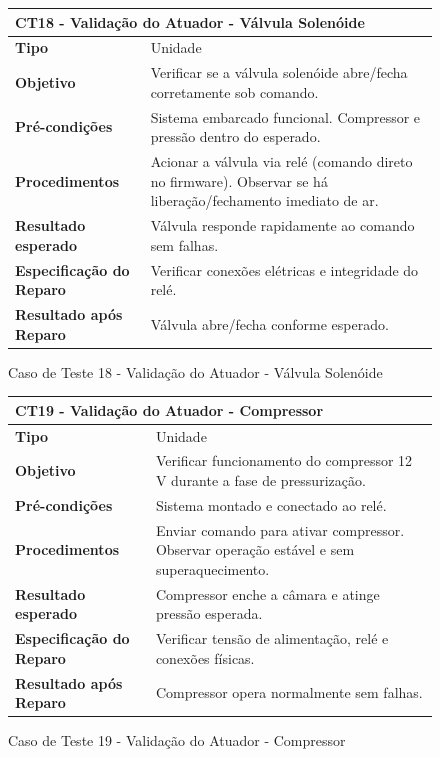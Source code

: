 \begin{figure}[H]
    \centering
\begin{longtable}{|p{}|p{}|}
\hline
\multicolumn{2}{|l|}{\textbf{CT18 - Validação do Atuador - Válvula Solenóide}} \\
\hline
\textbf{Tipo} & Unidade \\
\hline
\textbf{Objetivo} & Verificar se a válvula solenóide abre/fecha corretamente sob comando. \\
\hline
\textbf{Pré-condições} &  Sistema embarcado funcional.  Compressor e pressão dentro do esperado.  \\
\hline
\textbf{Procedimentos} &  Acionar a válvula via relé (comando direto no firmware).  Observar se há liberação/fechamento imediato de ar.  \\
\hline
\textbf{Resultado esperado} & Válvula responde rapidamente ao comando sem falhas. \\
\hline
\textbf{Especificação do Reparo} & Verificar conexões elétricas e integridade do relé. \\
\hline
\textbf{Resultado após Reparo} & Válvula abre/fecha conforme esperado. \\
\hline
\end{longtable}
\caption{Caso de Teste 18 - Validação do Atuador - Válvula Solenóide}
\label{fig_ct18_validacao_atuador_valvula_solenoide}
\end{figure}

\begin{figure}[H]
    \centering
\begin{longtable}{|p{}|p{}|}
\hline
\multicolumn{2}{|l|}{\textbf{CT19 - Validação do Atuador - Compressor}} \\
\hline
\textbf{Tipo} & Unidade \\
\hline
\textbf{Objetivo} & Verificar funcionamento do compressor 12 V durante a fase de pressurização. \\
\hline
\textbf{Pré-condições} & Sistema montado e conectado ao relé. \\
\hline
\textbf{Procedimentos} &  Enviar comando para ativar compressor.  Observar operação estável e sem superaquecimento.  \\
\hline
\textbf{Resultado esperado} & Compressor enche a câmara e atinge pressão esperada. \\
\hline
\textbf{Especificação do Reparo} & Verificar tensão de alimentação, relé e conexões físicas. \\
\hline
\textbf{Resultado após Reparo} & Compressor opera normalmente sem falhas. \\
\hline
\end{longtable}
\caption{Caso de Teste 19 - Validação do Atuador - Compressor}
\label{fig_ct19_validacao_atuador_compressor}
\end{figure}

